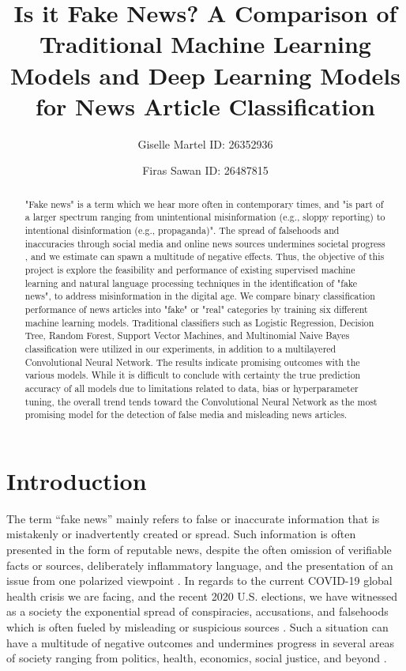 \documentclass[10pt,twocolumn,letterpaper]{article}
\begin{document}
\title{Is it Fake News? A Comparison of Traditional Machine Learning Models and Deep Learning Models for News Article Classification}
\author{Giselle Martel ID: 26352936 \and Firas Sawan ID: 26487815}
\maketitle
\begin{abstract}
\small
"Fake news" is a term which we hear more often in contemporary times, and "is part of a larger spectrum ranging from unintentional misinformation (e.g., sloppy reporting) to intentional disinformation (e.g., propaganda)"\cite{doi:https://doi.org/10.1002/9781118841570.iejs0128}. The spread of falsehoods and inaccuracies through social media and online news sources undermines societal progress \cite{doi:https://doi.org/10.1002/9781118841570.iejs0128}, and we estimate can spawn a multitude of negative effects. Thus, the objective of this project is explore the feasibility and performance of existing supervised machine learning and natural language processing techniques in the identification of "fake news", to address misinformation in the digital age. We compare binary classification performance of news articles into "fake" or "real" categories by training six different machine learning models. Traditional classifiers such as Logistic Regression, Decision Tree, Random Forest, Support Vector Machines, and Multinomial Naive Bayes classification were utilized in our experiments, in addition to a multilayered Convolutional Neural Network. The results indicate promising outcomes with the various models. While it is difficult to conclude with certainty the true prediction accuracy of all models due to limitations related to data, bias or hyperparameter tuning, the overall trend tends toward the Convolutional Neural Network as the most promising model for the detection of false media and misleading news articles.
\end{abstract} 

\section{Introduction}
\small
The term “fake news” mainly refers to false or inaccurate information that is mistakenly or inadvertently created or spread. Such information is often presented in the form of reputable news, despite the often omission of verifiable facts or sources, deliberately inflammatory language, and the presentation of an issue from one polarized viewpoint \cite{fakenews}. In regards to the current COVID-19 global health crisis we are facing, and the recent 2020 U.S. elections, we have witnessed as a society the exponential spread of conspiracies, accusations, and falsehoods which is often fueled by misleading or suspicious sources \cite{fakenews}. Such a situation can have a multitude of negative outcomes and undermines progress in several areas of society ranging from politics, health, economics, social justice, and beyond \cite{fakenews}.\par
\end{document}
